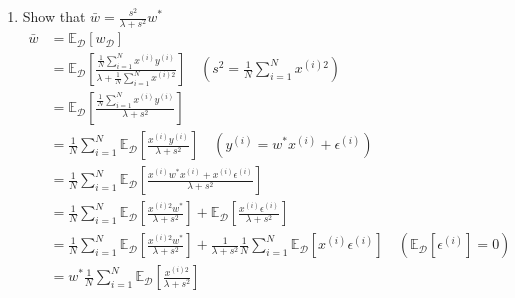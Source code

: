 \documentclass{article}
\theoremstyle{definition}
\theoremstyle{remark}
\begin{document}
\begin{enumerate}[font={\Large\bfseries},left=0pt]
\begin{enumerate}
		\item Show that $\bar{w} = \frac{s^2}{\lambda + s^2}w^*$
		      \begin{align}
			      \bar{w} & = \mathbb{E}_\mathcal{D} [w_\mathcal{D}]                                                                                                                                                                                                                                             \\
			              & = \mathbb{E}_\mathcal{D} \left[\frac{\frac{1}{N} \sum^{N}_{i = 1} x^{(i)} y^{(i)}}{\lambda + \frac{1}{N} \sum^{N}_{i = 1} x^{(i)2}}\right] \quad (s^2 = \frac{1}{N} \sum^N_{i = 1} x^{(i)2})                                                                                         \\
			              & = \mathbb{E}_\mathcal{D} \left[\frac{\frac{1}{N} \sum^{N}_{i = 1} x^{(i)} y^{(i)}}{\lambda + s^2}\right]                                                                                                                                                                             \\
			              & = \frac{1}{N} \sum^{N}_{i = 1} \mathbb{E}_\mathcal{D} \left[\frac{x^{(i)} y^{(i)}}{\lambda + s^2}\right] \quad (y^{(i)}=w^* x^{(i)}+\epsilon^{(i)})                                                                                                                                  \\
			              & = \frac{1}{N} \sum^{N}_{i = 1} \mathbb{E}_\mathcal{D} \left[\frac{x^{(i)} w^* x^{(i)}+ x^{(i)}\epsilon^{(i)}}{\lambda + s^2}\right]                                                                                                                                                  \\
			              & = \frac{1}{N} \sum^{N}_{i = 1} \mathbb{E}_\mathcal{D} \left[\frac{x^{(i)2} w^*}{\lambda + s^2}\right] + \mathbb{E}_\mathcal{D} \left[\frac{x^{(i)}\epsilon^{(i)}}{\lambda + s^2}\right]                                                                                              \\
			              & = \frac{1}{N} \sum^{N}_{i = 1} \mathbb{E}_\mathcal{D} \left[\frac{x^{(i)2} w^*}{\lambda + s^2}\right] + \frac{1}{\lambda + s^2}\frac{1}{N} \sum^{N}_{i = 1}\mathbb{E}_\mathcal{D} \left[x^{(i)}\epsilon^{(i)}\right]  \quad (\mathbb{E}_\mathcal{D} \left[\epsilon^{(i)}\right] = 0) \\
			              & = w^*\frac{1}{N} \sum^{N}_{i = 1} \mathbb{E}_\mathcal{D} \left[\frac{x^{(i)2}}{\lambda + s^2}\right]                                                                                                                                                                                 \\

\end{align}
\end{enumerate}
\end{enumerate}
\end{document}
